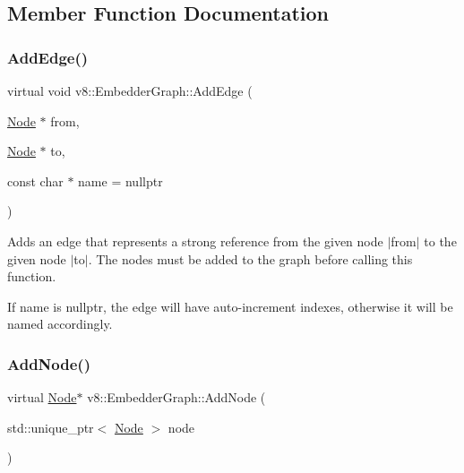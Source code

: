 \subsection{Member Function Documentation}
\mbox{\label{classv8_1_1EmbedderGraph_a81b1c7dd4d0387ec50037b0778b8af11}} 
\subsubsection{\texorpdfstring{Add\+Edge()}{AddEdge()}}
{\footnotesize\ttfamily virtual void v8\+::\+Embedder\+Graph\+::\+Add\+Edge (\begin{DoxyParamCaption}\item[{\mbox{\hyperlink{classv8_1_1EmbedderGraph_1_1Node}{Node}} $\ast$}]{from,  }\item[{\mbox{\hyperlink{classv8_1_1EmbedderGraph_1_1Node}{Node}} $\ast$}]{to,  }\item[{const char $\ast$}]{name = {\ttfamily nullptr} }\end{DoxyParamCaption})\hspace{0.3cm}{\ttfamily [pure virtual]}}

Adds an edge that represents a strong reference from the given node $\vert$from$\vert$ to the given node $\vert$to$\vert$. The nodes must be added to the graph before calling this function.

If name is nullptr, the edge will have auto-\/increment indexes, otherwise it will be named accordingly. \mbox{\label{classv8_1_1EmbedderGraph_a57afbce6126e5cd82b66f66b018a18e2}} 
\subsubsection{\texorpdfstring{Add\+Node()}{AddNode()}}
{\footnotesize\ttfamily virtual \mbox{\hyperlink{classv8_1_1EmbedderGraph_1_1Node}{Node}}$\ast$ v8\+::\+Embedder\+Graph\+::\+Add\+Node (\begin{DoxyParamCaption}\item[{std\+::unique\+\_\+ptr$<$ \mbox{\hyperlink{classv8_1_1EmbedderGraph_1_1Node}{Node}} $>$}]{node }\end{DoxyParamCaption})\hspace{0.3cm}{\ttfamily [pure virtual]}}

